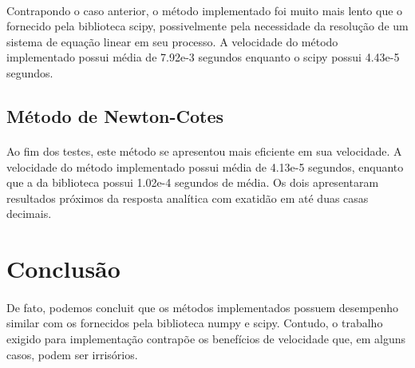 \documentclass{article}
\begin{document}
\paragraph{}Contrapondo o caso anterior, o método implementado foi muito mais lento que o fornecido pela biblioteca scipy, possivelmente pela necessidade da resolução de um sistema de equação linear em seu processo. A velocidade do método implementado possui média de 7.92e-3 segundos enquanto o scipy possui 4.43e-5 segundos.

\subsection{Método de Newton-Cotes}
\paragraph{}Ao fim dos testes, este método se apresentou mais eficiente em sua velocidade. A velocidade do método implementado possui média de 4.13e-5 segundos, enquanto que a da biblioteca possui 1.02e-4 segundos de média. Os dois apresentaram resultados próximos da resposta analítica com exatidão em até duas casas decimais.

\section{Conclusão}
\paragraph{}De fato, podemos concluit que os métodos implementados possuem desempenho similar com os fornecidos pela biblioteca numpy e scipy. Contudo, o trabalho exigido para implementação contrapõe os benefícios de velocidade que, em alguns casos, podem ser irrisórios.




\end{document}
